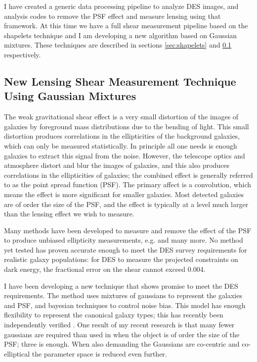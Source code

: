 \documentclass[12pt]{article}
\begin{document}
I have created a generic data processing pipeline to analyze DES images, and
analysis codes to remove the PSF effect and measure lensing using that
framework.  At this time we have a full shear measurement pipeline based on the
shapelets technique and I am developing a new algorithm based on Gaussian
mixtures.  These techniques are described in sections \ref{sec:shapelets} and
\ref{sec:gmix} respectively.

\subsection{New Lensing Shear Measurement Technique Using Gaussian Mixtures}
\label{sec:gmix}

The weak gravitational shear effect is a very small distortion of the images of
galaxies by foreground mass distributions due to the bending of light.  This
small distortion produces correlations in the ellipticities of the background
galaxies, which can only be measured statistically.  In principle all one needs
is enough galaxies to extract this signal from the noise.  However, the
telescope optics and atmosphere distort and blur the images of galaxies, and
this also produces correlations in the ellipticities of galaxies; the combined
effect is generally referred to as the point spread function (PSF). The primary
affect is a convolution, which means the effect is more significant for smaller
galaxies.  Most detected galaxies are of order the size of the PSF, and the
effect is typically at a level much larger than the lensing effect we wish to
measure.

Many methods have been developed to measure and remove the effect of the PSF to
produce unbiased ellipticity measurements, e.g.
\cite{ksb95,Bern02,Miller07,Melchior11} and many more.  No method yet tested
has proven accurate enough to meet the DES survey requirements for realistic
galaxy populations:  for DES to measure the projected constraints on
dark energy, the fractional error on the shear cannot exceed 0.004.

I have been developing a new technique that shows promise to meet the DES
requirements.  The method uses mixtures of gaussians to represent the galaxies
and PSF, and bayesian techniques to control noise bias.  This model has enough
flexibility to represent the canonical galaxy types; this has recently been
independently verified \citep{HoggGMix12}.  One result of my recent
research is that many fewer gaussians are required than used in
\cite{HoggGMix12} when the object is of order the size of the PSF; three is
enough.  When also demanding the Gaussians are co-centric and co-elliptical the
parameter space is reduced even further.  
\end{document}
